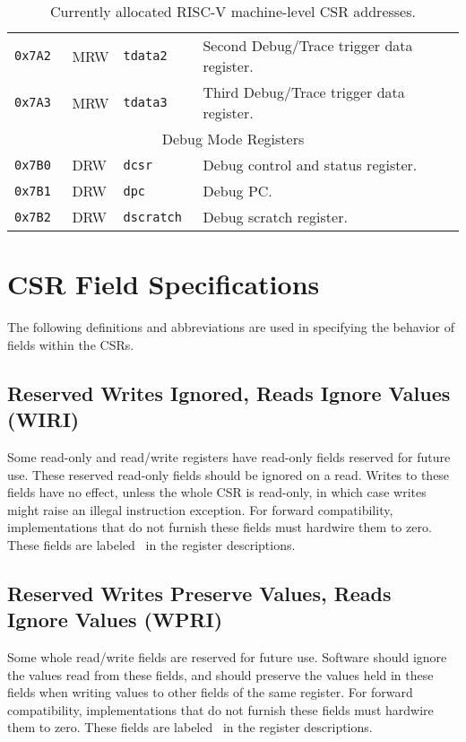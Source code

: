 \begin{table}[htb!]
\begin{center}
\begin{tabular}{|l|l|l|l|}
\tt 0x7A2 & MRW &\tt tdata2 & Second Debug/Trace trigger data register. \\
\tt 0x7A3 & MRW &\tt tdata3 & Third Debug/Trace trigger data register. \\
\hline
\multicolumn{4}{|c|}{Debug Mode Registers } \\
\hline
\tt 0x7B0 & DRW &\tt dcsr & Debug control and status register. \\
\tt 0x7B1 & DRW &\tt dpc & Debug PC. \\
\tt 0x7B2 & DRW &\tt dscratch & Debug scratch register. \\
\hline
\end{tabular}
\end{center}
\caption{Currently allocated RISC-V machine-level CSR addresses.}
\label{mcsrnames}
\end{table}

\clearpage

\section{CSR Field Specifications}


The following definitions and abbreviations are used in specifying the
behavior of fields within the CSRs.

\subsection*{Reserved Writes Ignored, Reads Ignore Values (WIRI)}

Some read-only and read/write registers have read-only fields reserved
for future use.  These reserved read-only fields should be ignored on
a read.  Writes to these fields have no effect, unless the whole CSR
is read-only, in which case writes might raise an illegal instruction
exception.
For forward compatibility, implementations that do not furnish these fields
must hardwire them to zero.
These fields are labeled \wiri\ in the register descriptions.

\subsection*{Reserved Writes Preserve Values, Reads Ignore Values (WPRI)}

Some whole read/write fields are reserved for future use.  Software
should ignore the values read from these fields, and should preserve
the values held in these fields when writing values to other fields of
the same register.
For forward compatibility, implementations that do not furnish these fields
must hardwire them to zero.
These fields are labeled \wpri\ in the register descriptions.

